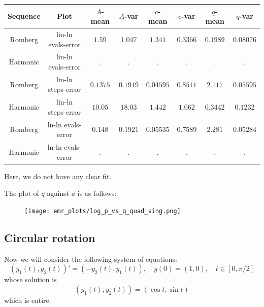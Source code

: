 \begin{table}[H]
    \centering
    \small
     \begin{tabular}{c|c||c|c|c|c|c|c}
Sequence & Plot & \(A\)-mean & \(A\)-var & \(c\)-mean & \(c\)-var & \(q\)-mean & \(q\)-var\\\hline
Romberg & lin-ln evals-error & \(1.59\) & \(1.047\) & \(1.341\) & \(0.3366\) & \(0.1989\) & \(0.08076\) \\
Harmonic & lin-ln evals-error & . & . & . & . & . & . \\
Romberg & lin-ln steps-error & \(0.1375\) & \(0.1919\) & \(0.04595\) & \(0.8511\) & \(2.117\) & \(0.05595\) \\
Harmonic & lin-ln steps-error & \(10.05\) & \(18.03\) & \(1.442\) & \(1.062\) & \(0.3442\) & \(0.1232\) \\
Romberg & ln-ln evals-error & \(0.148\) & \(0.1921\) & \(0.05535\) & \(0.7589\) & \(2.281\) & \(0.05284\) \\
Harmonic & ln-ln evals-error & . & . & . & . & . & . \\
    \end{tabular}
    \label{tab:my_label}
\end{table}

Here, we do not have any clear fit.

The plot of \(q\) against \(a\) is as follows:

\begin{figure}[H]
\centering
\begin{minipage}{0.45\textwidth}
\centering
\texttt{[image: emr\_plots/log\_p\_vs\_q\_quad\_sing.png]}
\end{minipage}
\end{figure}

\subsection{Circular rotation}

Now we will consider the following system of equations:
\begin{equation}\label{48}
(y_1(t),y_2(t))' = (-y_2(t), y_1(t)), \quad y(0) = (1,0), \quad t\in [0,\pi /2]
\end{equation}
whose solution is 
\[
(y_1(t),y_2(t)) = (\cos t, \sin t)
\]
which is entire.

